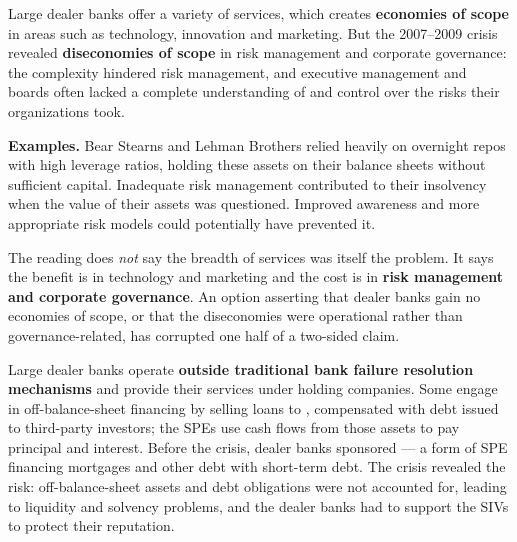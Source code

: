 \begin{lrkeybox}
Large dealer banks offer a variety of services, which creates \textbf{economies of scope} in areas such as technology, innovation and marketing. But the 2007--2009 crisis revealed \textbf{diseconomies of scope} in risk management and corporate governance: the complexity hindered risk management, and executive management and boards often lacked a complete understanding of and control over the risks their organizations took.

\textbf{Examples.} Bear Stearns and Lehman Brothers relied heavily on overnight repos with high leverage ratios, holding these assets on their balance sheets without sufficient capital. Inadequate risk management contributed to their insolvency when the value of their assets was questioned. Improved awareness and more appropriate risk models could potentially have prevented it.
\end{lrkeybox}

\begin{lrtrapbox}
The reading does \emph{not} say the breadth of services was itself the problem. It says the benefit is in technology and marketing and the cost is in \textbf{risk management and corporate governance}. An option asserting that dealer banks gain no economies of scope, or that the diseconomies were operational rather than governance-related, has corrupted one half of a two-sided claim.
\end{lrtrapbox}

\begin{lrkeybox}
Large dealer banks operate \textbf{outside traditional bank failure resolution mechanisms} and provide their services under holding companies. Some engage in off-balance-sheet financing by selling loans to , compensated with debt issued to third-party investors; the SPEs use cash flows from those assets to pay principal and interest. Before the crisis, dealer banks sponsored  --- a form of SPE financing mortgages and other debt with short-term debt. The crisis revealed the risk: off-balance-sheet assets and debt obligations were not accounted for, leading to liquidity and solvency problems, and the dealer banks had to support the SIVs to protect their reputation.
\end{lrkeybox}

